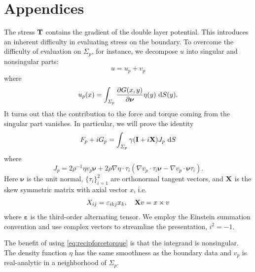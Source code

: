 \documentclass[lineno]{jfm}
\newcommand{\nnu}{\boldsymbol{\nu}}
\begin{document}
\section{Appendices}
\label{sec:appendixA}
The stress ${\bf T}$ contains the gradient of the double layer
potential. This introduces an inherent difficulty in evaluating stress
on the boundary.  To overcome the difficulty of evaluation on
$\Sigma_p$, for instance, we decompose $u$ into singular and nonsingular
parts:
\begin{equation}
u = u_p + v_p
\end{equation}
where  
\begin{equation}
u_p(x) = \int_{\Sigma_p} \frac{\partial G(x,y)}{\partial \nnu} \eta(y) \,\dif S(y).
\end{equation}
It turns out that the contribution to the force and torque coming from the singular
part vanishes. In particular, we will prove the identity
\begin{equation}
\label{eq:recipforcetorque}
F_p + iG_p= \int_{\Sigma_p} \gamma ({\bf I}+i{\bf X})J_{p} \,\dif S
\end{equation}
where
 \begin{equation}
\label{eq:jumpstress1}
J_{p} = 2\rho^{-1} \eta  v_p \nnu 
+ 2\rho \nabla \eta \cdot \tau_i(\nabla v_p \cdot \tau_i \nnu -  \nabla
   v_p \cdot \nnu \tau_i).
\end{equation}
Here $\nnu$ is the unit normal, $\{\tau_i\}_{i=1}^2$ are orthonormal tangent vectors,
and ${\bf X}$ is the skew symmetric matrix with axial vector $x$, i.e.
\[X_{ij} = \varepsilon_{ikj}x_k,\quad {\bf X}v = x\times v\]
where $\boldsymbol{\varepsilon}$ is the third-order alternating tensor.
We employ the Einstein summation convention and use complex vectors to streamline the presentation, $i^2 = -1$.

The benefit of using \eqref{eq:recipforcetorque} is that the integrand  is nonsingular.
The density function $\eta$ has the same smoothness as the boundary data
and $v_p$ is real-analytic in a neighborhood of $\Sigma_p$.
\end{document}
